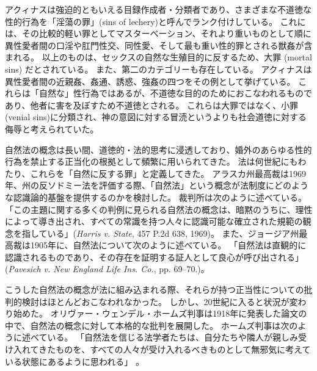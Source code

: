 \documentclass[paper=a4,book,openany]{jlreq}
\begin{document}
アクィナスは強迫的ともいえる目録作成者・分類者であり、さまざまな不道徳な性的行為を「淫蕩の罪」(sins of lechery)と呼んでランク付けしている。
これには、その比較的軽い罪としてマスターベーション、それより重いものとして順に異性愛者間の口淫や肛門性交、同性愛、そして最も重い性的罪とされる獣姦が含まれる。
以上のものは、セックスの自然な生殖目的に反するため、大罪 (mortal sins) だとされている。
また、第二のカテゴリーも存在している。
アクィナスは異性愛者間の近親姦、姦通、誘惑、強姦の四つをその例として挙げている。
これらは「自然な」性行為ではあるが、不道徳な目的のためにおこなわれるものであり、他者に害を及ぼすため不道徳とされる。
これらは大罪ではなく、小罪(venial sins)に分類され、神の意図に対する冒涜というよりも社会道徳に対する侮辱と考えられていた\citep[cf.][II.ii, Question 154]{aquinas20:_summa_theol}。

自然法の概念は長い間、道徳的・法的思考に浸透しており、婚外のあらゆる性的行為を禁止する正当化の根拠として頻繁に用いられてきた。
法は何世紀にもわたり、これらを「自然に反する罪」と定義してきた。
アラスカ州最高裁は1969年、州の反ソドミー法を評価する際、「自然法」という概念が法制度にどのような認識論的基盤を提供するのかを検討した。
裁判所は次のように述べている。
「この主題に関する多くの判例に見られる自然法の概念は、暗黙のうちに、理性によって導き出され、すべての常識を持つ人々に認識可能な確立された規範の観念を指している」(\emph{Harris v. State}, 457 P.2d 638, 1969)。
また、ジョージア州最高裁は1905年に、自然法について次のように述べている。
「自然法は直観的に認識されるものであり、その存在を証明する証人として良心が呼び出される」(\emph{Pavesich v. New England Life Ins. Co.}, pp. 69--70.)。

こうした自然法の概念が法に組み込まれる際、それらが持つ正当性についての批判的検討はほとんどおこなわれなかった。
しかし、20世紀に入ると状況が変わり始めた。
オリヴァー・ウェンデル・ホームズ判事は1918年に発表した論文の中で、自然法の概念に対して本格的な批判を展開した。
ホームズ判事は次のように述べている。
「自然法を信じる法学者たちは、自分たちや隣人が親しみ受け入れてきたものを、すべての人々が受け入れるべきものとして無邪気に考えている状態にあるように思われる」\citep[p.40]{holmes18:_natur_law} 。
\end{document}
